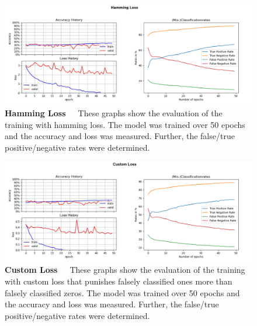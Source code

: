\begin{figure}[!htb]
    \centering
    \includegraphics[scale=0.37]{Figures/chapter04/multilabel_hamming.png}
    \decoRule
    \caption[Multi-Label Hamming Loss]{\textbf{Hamming Loss}~~~These graphs show the evaluation of the training with hamming loss. The model was trained over 50 epochs and the accuracy and loss was measured. Further, the false/true positive/negative rates were determined.}
    \label{fig:MultilabelHammingLoss}
\end{figure}

\begin{figure}[!htb]
    \centering
    \includegraphics[scale=0.37]{Figures/chapter04/multilabel_costum.png}
    \decoRule
    \caption[Multi-Label Custom Loss]{\textbf{Custom Loss}~~~These graphs show the evaluation of the training with custom loss that punishes falsely classified ones more than falsely classified zeros. The model was trained over 50 epochs and the accuracy and loss was measured. Further, the false/true positive/negative rates were determined.}
    \label{fig:MultilabelCostumLoss}
\end{figure}


